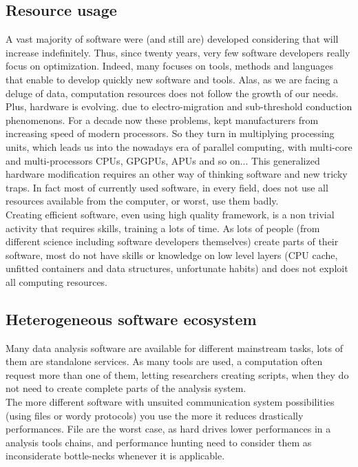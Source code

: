 \documentclass[11pt, twoside]{article}
\begin{document}
		\subsection{Resource usage}
			A vast majority of software were (and still are) developed considering that will increase indefinitely.
			Thus, since twenty years, very few software developers really focus on optimization.
			Indeed, many focuses on tools, methods and languages that enable to develop quickly new software and tools.
			Alas, as we are facing a deluge of data, computation resources does not follow the growth of our needs.
			~~\\
			Plus, hardware is evolving. due to electro-migration and sub-threshold conduction phenomenons.
			For a decade now these problems, kept manufacturers from increasing speed of modern processors.
			So they turn in multiplying processing units, which leads us into the nowadays era of parallel computing, with multi-core and multi-processors CPUs, GPGPUs, APUs and so on...
			This generalized hardware modification requires an other way of thinking software and new tricky traps.
			In fact most of currently used software, in every field, does not use all resources available from the computer, or worst, use them badly.
			\\
			Creating efficient software, even using high quality framework, is a non trivial activity that requires skills, training a lots of time.
			As lots of people (from different science including software developers themselves) create parts of their software, most do not have skills or knowledge on low level layers (CPU cache, unfitted containers and data structures, unfortunate habits) and does not exploit all computing resources.

		\subsection{Heterogeneous software ecosystem}
			Many data analysis software are available for different mainstream tasks, lots of them are standalone services.
			As many tools are used, a computation often request more than one of them, letting researchers creating scripts, when they do not need to create complete parts of the analysis system.
			\\
			The more different software with unsuited communication system possibilities (using files or wordy protocols) you use the more it reduces drastically performances.
			File are the worst case, as hard drives lower performances in a analysis tools chains, and performance hunting need to consider them as inconsiderate bottle-necks whenever it is applicable.
\end{document}
